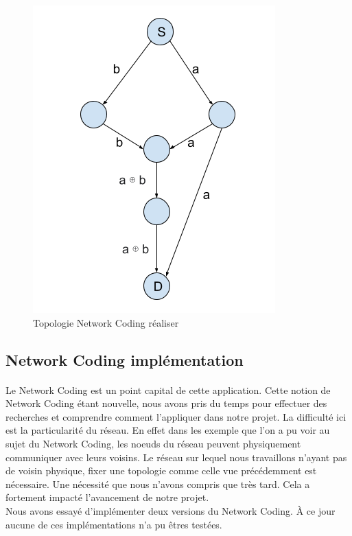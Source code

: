         \begin{figure}[H]
                \centering
                \includegraphics[scale=0.5]{images/NC_topology.png}
                \caption{Topologie Network Coding réaliser}
                \label{fig:Network_Coding_Topologie}
        \end{figure}
        
        \subsection{Network Coding implémentation}
        
        \paragraph{} Le Network Coding est un point capital de cette application. Cette notion de Network Coding étant nouvelle, nous avons pris du temps pour effectuer des recherches et comprendre comment l'appliquer dans notre projet. La difficulté ici est la particularité du réseau. En effet dans les exemple que l'on a pu voir au sujet du Network Coding, les noeuds du réseau peuvent physiquement communiquer avec leurs voisins.
        Le réseau sur lequel nous travaillons n'ayant pas de voisin physique, fixer une topologie comme celle vue précédemment est nécessaire.
        Une nécessité que nous n'avons compris que très tard. Cela a fortement impacté l'avancement de notre projet.\\
        Nous avons essayé d'implémenter deux versions du Network Coding. À ce jour aucune de ces implémentations n'a pu êtres testées.
        
